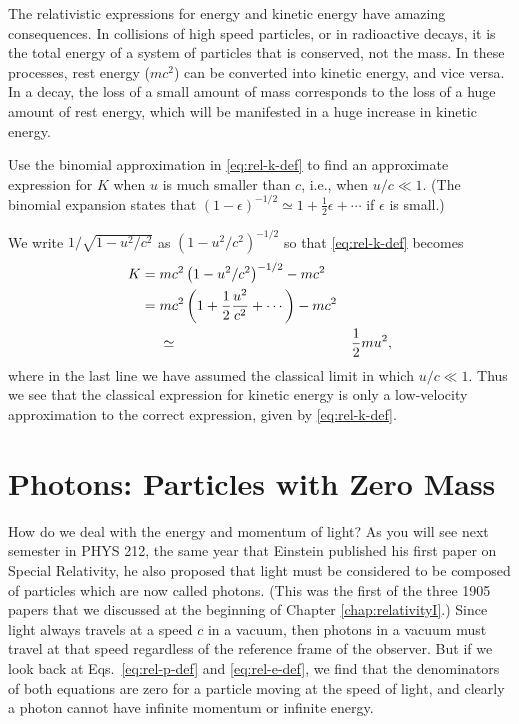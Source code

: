 The relativistic expressions for energy and kinetic energy have 
amazing consequences.  In collisions of high speed particles, or 
in radioactive decays, it is the total energy of a system of 
particles that is conserved, not the mass.  In these processes,
rest energy ($mc^2$) can be converted into kinetic energy, and vice 
versa.  In a decay, the loss of a small amount of mass corresponds to the 
loss of a huge amount of rest energy, which will be manifested 
in a huge increase in kinetic energy. 
 
 






\begin{example}  

Use the binomial approximation in \eqref{eq:rel-k-def} to find
an approximate expression for $K$ when $u$ is much smaller than
$c$, i.e., when $u/c \ll 1$.  (The binomial expansion states that
$(1-\epsilon)^{-1/2} \simeq 1 + \frac{1}{2}\epsilon + \cdots$ if
$\epsilon$ is small.)



\solution
We write $1/\sqrt{1-u^2/c^2}$ as $(1 - u^2/c^2)^{-1/2}$ so that
\eqref{eq:rel-k-def} becomes
\begin{eqnarray}
K =\mathstrut & mc^2\left(1-u^2/c^2\right)^{-1/2} - mc^2  \\
  =\mathstrut & mc^2 \left(1 + \frac{1}{2}\frac{u^2}{c^2} + \cdots\right) - mc^2 \\
  &\simeq&  \frac{1}{2}mu^2 , 
\end{eqnarray}
where in the last line we have assumed the classical limit in which
$u/c \ll 1$.
Thus we see that the classical expression for kinetic energy is only a
low-velocity approximation to the correct expression, given by
\eqref{eq:rel-k-def}.
\end{example}

\section{Photons: Particles with Zero Mass}

How do we deal with the energy and momentum of light? As you will see
next semester in PHYS 212, the same year that Einstein published his
first paper on Special Relativity, he also proposed that light must be
considered to be composed of particles which are now called photons.
(This was the first of the three 1905 papers that we discussed at the
beginning of Chapter \ref{chap:relativityI}.)  Since light always travels
at a speed $c$ in a vacuum, then photons in a vacuum must travel at
that speed regardless of the reference frame of the observer.  But if
we look back at Eqs.~\eqref{eq:rel-p-def} and \eqref{eq:rel-e-def}, we
find that the denominators of both equations are zero for a particle
moving at the speed of light, and clearly a photon cannot have
infinite momentum or infinite energy.

